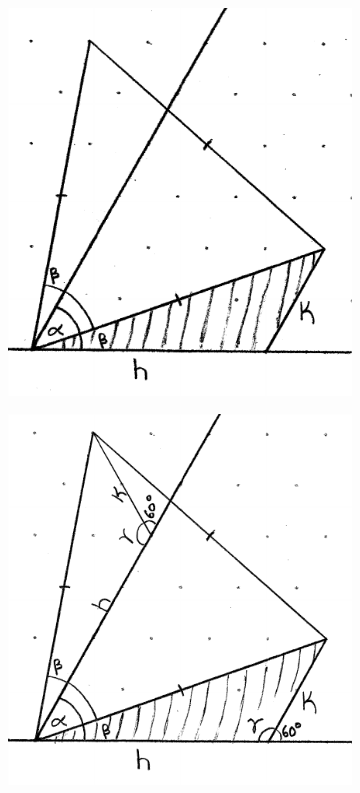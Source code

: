 \documentclass[12pt,letter]{article}
\begin{document}
\begin{figure}[b!]
	\centering
	\caption{Locating Point P}
	\begin{subfigure}[h]{0.45\textwidth}
		\includegraphics[width = \textwidth]{ddagger4.pdf}
		\caption{}
		\label{fig:equil_angles}
	\end{subfigure}
	\begin{subfigure}[h]{0.45\textwidth}
		\includegraphics[width = \textwidth]{ddagger5.pdf}
		\caption{}
		\label{fig:equil_congruent}
	\end{subfigure}
\end{figure}
\end{document}
